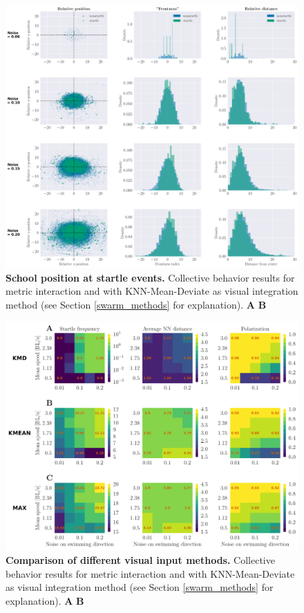 \documentclass[a4paper,10pt,hidelinks]{scrreprt}
\begin{document}
    \begin{figure}[H]
    \begin{center}
    \includegraphics[width=\textwidth]{looming_swarm_startle_stats.pdf}
    \end{center}
    \caption{\textbf{School position at startle events.} Collective behavior results for metric interaction and with KNN-Mean-Deviate as visual integration method (see Section \ref{swarm_methods} for explanation). \textbf{A} \textbf{B} }
    \label{fig:swarm_startle_stats}
    \end{figure}
    
    \begin{figure}[H]
    \begin{center}
    \includegraphics[width=\textwidth]{looming_swarm_fixed_rhonull_int_type_matrix_comparison_new.pdf}
    \end{center}
    \caption{\textbf{Comparison of different visual input methods.} Collective behavior results for metric interaction and with KNN-Mean-Deviate as visual integration method (see Section \ref{swarm_methods} for explanation). \textbf{A} \textbf{B} }
    \label{fig:swarm_comparison}
    \end{figure}
\end{document}
